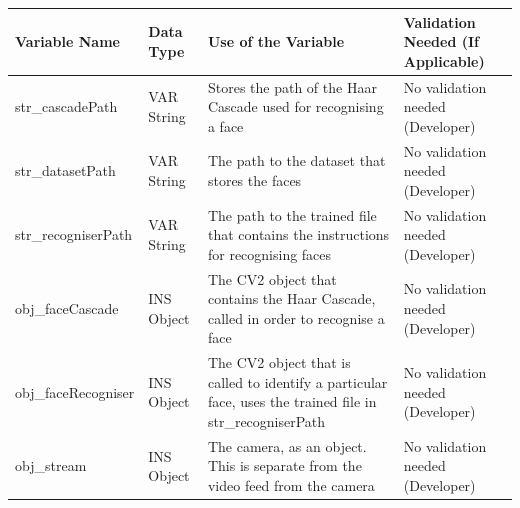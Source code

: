 \documentclass[9pt]{article}
\begin{document}
\begin{table}[H]
	\centering
	\begin{tabularx}{\textwidth}{llXX}
		\textbf{Variable Name} & \textbf{Data Type} & \textbf{Use of the Variable}                                                                                                                      & \textbf{Validation Needed (If Applicable)}                                                                           \\ \midrule
		str\_cascadePath       & VAR String         & Stores the path of the Haar Cascade used for recognising a face                                                                                   & No validation needed (Developer)                                                                                     \\
		str\_datasetPath       & VAR String         & The path to the dataset that stores the faces                                                                                                     & No validation needed (Developer)                                                                                     \\
		str\_recogniserPath    & VAR String         & The path to the trained file that contains the instructions for recognising faces                                                                 & No validation needed (Developer)                                                                                     \\
		obj\_faceCascade       & INS Object         & The CV2 object that contains the Haar Cascade, called in order to recognise a face                                                                & No validation needed (Developer)                                                                                     \\
		obj\_faceRecogniser    & INS Object         & The CV2 object that is called to identify a particular face, uses the trained file in str\_recogniserPath                                         & No validation needed (Developer)                                                                                     \\
		obj\_stream            & INS Object         & The camera, as an object. This is separate from the video feed from the camera                                                                    & No validation needed (Developer)                                                                                     \\

\end{tabularx}
\end{table}
\end{document}
